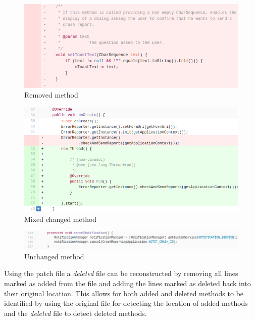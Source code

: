 \begin{figure}[!ht]
    \centering
        \includegraphics[width=1.0\textwidth]{images/deleted_method}
    \caption{Removed method}
    \label{fig:removed_method}
\end{figure}

\begin{figure}[!ht]
    \centering
        \includegraphics[width=1.0\textwidth]{images/simple_complex}
    \caption{Mixed changed method}
    \label{fig:changed_method}
\end{figure}

\begin{figure}[!ht]
    \centering
        \includegraphics[width=1.0\textwidth]{images/unchanged_example}
    \caption{Unchanged method}
    \label{fig:unchanged_method}
\end{figure}


Using the patch file a \textit{deleted} file can be reconstructed by removing all lines marked as added from the file and adding the lines marked as deleted back into their original location. This allows for both added and deleted methods to be identified by using the original file for detecting the location of added methods and the \textit{deleted} file to detect deleted methods.

